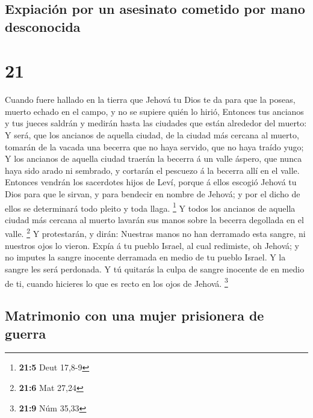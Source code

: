\hypertarget{expiaciuxf3n-por-un-asesinato-cometido-por-mano-desconocida}{%
\subsection{Expiación por un asesinato cometido por mano
desconocida}\label{expiaciuxf3n-por-un-asesinato-cometido-por-mano-desconocida}}

\hypertarget{section-20}{%
\section{21}\label{section-20}}

 Cuando fuere hallado en la tierra que Jehová tu Dios te
da para que la poseas, muerto echado en el campo, y no se supiere quién
lo hirió,  Entonces tus ancianos y tus jueces saldrán y
medirán hasta las ciudades que están alrededor del muerto:
 Y será, que los ancianos de aquella ciudad, de la ciudad
más cercana al muerto, tomarán de la vacada una becerra que no haya
servido, que no haya traído yugo;  Y los ancianos de
aquella ciudad traerán la becerra á un valle áspero, que nunca haya sido
arado ni sembrado, y cortarán el pescuezo á la becerra allí en el valle.
 Entonces vendrán los sacerdotes hijos de Leví, porque á
ellos escogió Jehová tu Dios para que le sirvan, y para bendecir en
nombre de Jehová; y por el dicho de ellos se determinará todo pleito y
toda llaga. \footnote{\textbf{21:5} Deut 17,8-9}  Y todos
los ancianos de aquella ciudad más cercana al muerto lavarán sus manos
sobre la becerra degollada en el valle. \footnote{\textbf{21:6} Mat
  27,24}  Y protestarán, y dirán: Nuestras manos no han
derramado esta sangre, ni nuestros ojos lo vieron.  Expía
á tu pueblo Israel, al cual redimiste, oh Jehová; y no imputes la sangre
inocente derramada en medio de tu pueblo Israel. Y la sangre les será
perdonada.  Y tú quitarás la culpa de sangre inocente de
en medio de ti, cuando hicieres lo que es recto en los ojos de Jehová.
\footnote{\textbf{21:9} Núm 35,33}

\hypertarget{matrimonio-con-una-mujer-prisionera-de-guerra}{%
\subsection{Matrimonio con una mujer prisionera de
guerra}\label{matrimonio-con-una-mujer-prisionera-de-guerra}}

